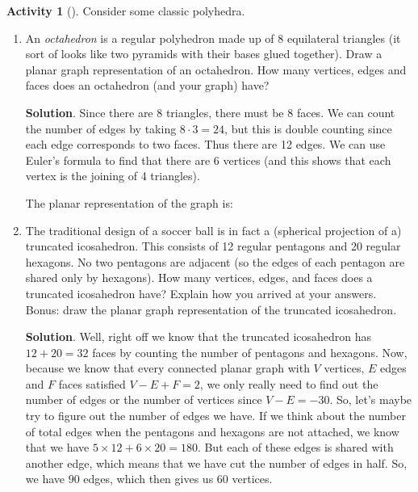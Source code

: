 \documentclass[10pt,]{book}
\theoremstyle{plain}
\theoremstyle{definition}
\theoremstyle{definition}
\theoremstyle{definition}
\newtheorem{activity}[project]{Activity}
\numberwithin{equation}{chapter}
\begin{document}
\begin{activity}[]\label{activity-29}
\hypertarget{p-309}{}%
Consider some classic polyhedra.%
\begin{enumerate}[font=\bfseries,label=(\alph*),ref=\alph*]
\item\label{task-41} \hypertarget{p-310}{}%
An \emph{octahedron} is a regular polyhedron made up of 8 equilateral triangles (it sort of looks like two pyramids with their bases glued together). Draw a planar graph representation of an octahedron. How many vertices, edges and faces does an octahedron (and your graph) have?%
\par\smallskip%
\noindent\textbf{Solution}.\hypertarget{solution-18}{}\quad%
\hypertarget{p-311}{}%
Since there are 8 triangles, there must be 8 faces. We can count the number of edges by taking \(8 \cdot 3 = 24\), but this is double counting since each edge corresponds to two faces. Thus there are 12 edges. We can use Euler's formula to find that there are 6 vertices (and this shows that each vertex is the joining of 4 triangles).%
\par
\hypertarget{p-312}{}%
The planar representation of the graph is:%
\item\label{task-42} \hypertarget{p-313}{}%
The traditional design of a soccer ball is in fact a (spherical projection of a) truncated icosahedron. This consists of 12 regular pentagons and 20 regular hexagons. No two pentagons are adjacent (so the edges of each pentagon are shared only by hexagons). How many vertices, edges, and faces does a truncated icosahedron have? Explain how you arrived at your answers. Bonus: draw the planar graph representation of the truncated icosahedron.%
\par\smallskip%
\noindent\textbf{Solution}.\hypertarget{solution-19}{}\quad%
\hypertarget{p-314}{}%
Well, right off we know that the truncated icosahedron has \(12+20=32\) faces by counting the number of pentagons and hexagons. Now, because we know that every connected planar graph with \(V\) vertices, \(E\) edges and \(F\) faces satisfied \(V - E + F = 2\), we only really need to find out the number of edges or the number of vertices since \(V-E=-30\). So, let's maybe try to figure out the number of edges we have. If we think about the number of total edges when the pentagons and hexagons are not attached, we know that we have \(5\times 12+6\times 20=180\). But each of these edges is shared with another edge, which means that we have cut the number of edges in half. So, we have \(90\) edges, which then gives us \(60\) vertices.%

\end{enumerate}
\end{activity}
\end{document}
